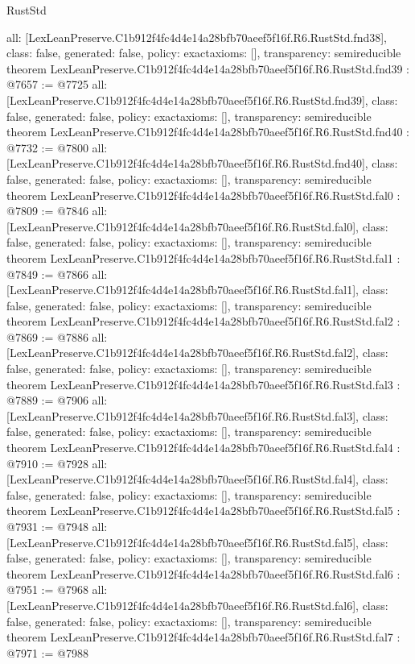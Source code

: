 \begin{lexlean}{RustStd}
\begin{coremodule}
{  all: [LexLeanPreserve.C1b912f4fc4d4e14a28bfb70aeef5f16f.R6.RustStd.fnd38],
  class: false,
  generated: false,
  policy: exact{axioms: []},
  transparency: semireducible
}
theorem LexLeanPreserve.C1b912f4fc4d4e14a28bfb70aeef5f16f.R6.RustStd.fnd39 : @7657 := @7725 {
  all: [LexLeanPreserve.C1b912f4fc4d4e14a28bfb70aeef5f16f.R6.RustStd.fnd39],
  class: false,
  generated: false,
  policy: exact{axioms: []},
  transparency: semireducible
}
theorem LexLeanPreserve.C1b912f4fc4d4e14a28bfb70aeef5f16f.R6.RustStd.fnd40 : @7732 := @7800 {
  all: [LexLeanPreserve.C1b912f4fc4d4e14a28bfb70aeef5f16f.R6.RustStd.fnd40],
  class: false,
  generated: false,
  policy: exact{axioms: []},
  transparency: semireducible
}
theorem LexLeanPreserve.C1b912f4fc4d4e14a28bfb70aeef5f16f.R6.RustStd.fal0 : @7809 := @7846 {
  all: [LexLeanPreserve.C1b912f4fc4d4e14a28bfb70aeef5f16f.R6.RustStd.fal0],
  class: false,
  generated: false,
  policy: exact{axioms: []},
  transparency: semireducible
}
theorem LexLeanPreserve.C1b912f4fc4d4e14a28bfb70aeef5f16f.R6.RustStd.fal1 : @7849 := @7866 {
  all: [LexLeanPreserve.C1b912f4fc4d4e14a28bfb70aeef5f16f.R6.RustStd.fal1],
  class: false,
  generated: false,
  policy: exact{axioms: []},
  transparency: semireducible
}
theorem LexLeanPreserve.C1b912f4fc4d4e14a28bfb70aeef5f16f.R6.RustStd.fal2 : @7869 := @7886 {
  all: [LexLeanPreserve.C1b912f4fc4d4e14a28bfb70aeef5f16f.R6.RustStd.fal2],
  class: false,
  generated: false,
  policy: exact{axioms: []},
  transparency: semireducible
}
theorem LexLeanPreserve.C1b912f4fc4d4e14a28bfb70aeef5f16f.R6.RustStd.fal3 : @7889 := @7906 {
  all: [LexLeanPreserve.C1b912f4fc4d4e14a28bfb70aeef5f16f.R6.RustStd.fal3],
  class: false,
  generated: false,
  policy: exact{axioms: []},
  transparency: semireducible
}
theorem LexLeanPreserve.C1b912f4fc4d4e14a28bfb70aeef5f16f.R6.RustStd.fal4 : @7910 := @7928 {
  all: [LexLeanPreserve.C1b912f4fc4d4e14a28bfb70aeef5f16f.R6.RustStd.fal4],
  class: false,
  generated: false,
  policy: exact{axioms: []},
  transparency: semireducible
}
theorem LexLeanPreserve.C1b912f4fc4d4e14a28bfb70aeef5f16f.R6.RustStd.fal5 : @7931 := @7948 {
  all: [LexLeanPreserve.C1b912f4fc4d4e14a28bfb70aeef5f16f.R6.RustStd.fal5],
  class: false,
  generated: false,
  policy: exact{axioms: []},
  transparency: semireducible
}
theorem LexLeanPreserve.C1b912f4fc4d4e14a28bfb70aeef5f16f.R6.RustStd.fal6 : @7951 := @7968 {
  all: [LexLeanPreserve.C1b912f4fc4d4e14a28bfb70aeef5f16f.R6.RustStd.fal6],
  class: false,
  generated: false,
  policy: exact{axioms: []},
  transparency: semireducible
}
theorem LexLeanPreserve.C1b912f4fc4d4e14a28bfb70aeef5f16f.R6.RustStd.fal7 : @7971 := @7988 {
}
\end{coremodule}
\end{lexlean}
